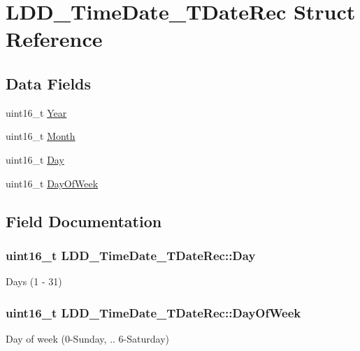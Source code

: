 \hypertarget{struct_l_d_d___time_date___t_date_rec}{}\section{L\+D\+D\+\_\+\+Time\+Date\+\_\+\+T\+Date\+Rec Struct Reference}
\label{struct_l_d_d___time_date___t_date_rec}
\subsection*{Data Fields}
\begin{DoxyCompactItemize}
\item 
uint16\+\_\+t \hyperlink{struct_l_d_d___time_date___t_date_rec_a58eee644efb4f46adc3437063c7bc194}{Year}
\item 
uint16\+\_\+t \hyperlink{struct_l_d_d___time_date___t_date_rec_a28aaeffe98b07d60db379d12269fa822}{Month}
\item 
uint16\+\_\+t \hyperlink{struct_l_d_d___time_date___t_date_rec_a6f1463c1917d6fe55a492bdb85a6bd17}{Day}
\item 
uint16\+\_\+t \hyperlink{struct_l_d_d___time_date___t_date_rec_a11ed8bc2e3fbd80252a7d4802d316f1c}{Day\+Of\+Week}
\end{DoxyCompactItemize}


\subsection{Field Documentation}
\subsubsection[{\texorpdfstring{Day}{Day}}]{\setlength{\rightskip}{0pt plus 5cm}uint16\+\_\+t L\+D\+D\+\_\+\+Time\+Date\+\_\+\+T\+Date\+Rec\+::\+Day}\hypertarget{struct_l_d_d___time_date___t_date_rec_a6f1463c1917d6fe55a492bdb85a6bd17}{}\label{struct_l_d_d___time_date___t_date_rec_a6f1463c1917d6fe55a492bdb85a6bd17}
Days (1 -\/ 31) 
\subsubsection[{\texorpdfstring{Day\+Of\+Week}{DayOfWeek}}]{\setlength{\rightskip}{0pt plus 5cm}uint16\+\_\+t L\+D\+D\+\_\+\+Time\+Date\+\_\+\+T\+Date\+Rec\+::\+Day\+Of\+Week}\hypertarget{struct_l_d_d___time_date___t_date_rec_a11ed8bc2e3fbd80252a7d4802d316f1c}{}\label{struct_l_d_d___time_date___t_date_rec_a11ed8bc2e3fbd80252a7d4802d316f1c}
Day of week (0-\/\+Sunday, .. 6-\/\+Saturday) 
